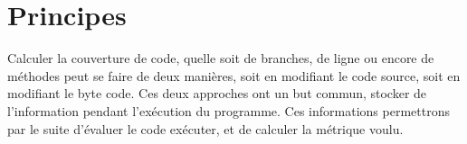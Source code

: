 \section{Principes}
\label{sec:principes}

Calculer la couverture de code, quelle soit de branches, de ligne ou encore de méthodes peut se faire de deux manières\cite{baxter}, soit en modifiant le code source, soit en modifiant le byte code. Ces deux approches ont un but commun, stocker de l’information pendant l’exécution du programme. Ces informations permettrons par le suite d’évaluer le code exécuter, et de calculer la métrique voulu.
